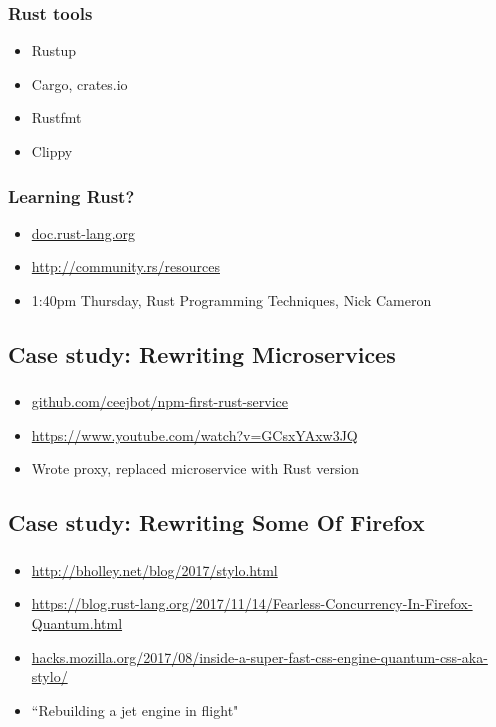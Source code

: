 \documentclass{beamer}
\begin{document}
\begin{frame}[fragile]
\frametitle{Rust tools}
\begin{itemize}[<+(1)->]
\item Rustup
\item Cargo, crates.io
\item Rustfmt
\item Clippy
\end{itemize}
\end{frame}

\begin{frame}[fragile]
\frametitle{Learning Rust?}
\begin{itemize}[<+(1)->]
\item \url{doc.rust-lang.org}
\item \url{http://community.rs/resources}
\item 1:40pm Thursday, Rust Programming Techniques, Nick Cameron
\end{itemize}
\end{frame}

\subsection{Case study: Rewriting Microservices}

\begin{frame}[fragile]
\frametitle{\insertsubsectionhead}
\begin{itemize}[<+(1)->]
\item \url{github.com/ceejbot/npm-first-rust-service}
\item \url{https://www.youtube.com/watch?v=GCsxYAxw3JQ}
\item Wrote proxy, replaced microservice with Rust version
\end{itemize}
\end{frame}

\subsection{Case study: Rewriting Some Of Firefox}

\begin{frame}[fragile]
\frametitle{\insertsubsectionhead}
\begin{itemize}[<+(1)->]
\item \url{http://bholley.net/blog/2017/stylo.html}
\item \url{https://blog.rust-lang.org/2017/11/14/Fearless-Concurrency-In-Firefox-Quantum.html}
\item \url{hacks.mozilla.org/2017/08/inside-a-super-fast-css-engine-quantum-css-aka-stylo/}
\item ``Rebuilding a jet engine in flight"
\end{itemize}
\end{frame}
\end{document}
